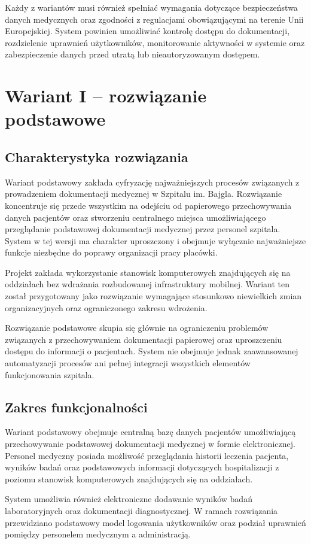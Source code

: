 Każdy z wariantów musi również spełniać wymagania dotyczące bezpieczeństwa danych medycznych oraz zgodności z regulacjami obowiązującymi na terenie Unii Europejskiej. System powinien umożliwiać kontrolę dostępu do dokumentacji, rozdzielenie uprawnień użytkowników, monitorowanie aktywności w systemie oraz zabezpieczenie danych przed utratą lub nieautoryzowanym dostępem.
\section{Wariant I – rozwiązanie podstawowe}

\subsection{Charakterystyka rozwiązania}
Wariant podstawowy zakłada cyfryzację najważniejszych procesów związanych z prowadzeniem dokumentacji medycznej w Szpitalu im. Bajgla. Rozwiązanie koncentruje się przede wszystkim na odejściu od papierowego przechowywania danych pacjentów oraz stworzeniu centralnego miejsca umożliwiającego przeglądanie podstawowej dokumentacji medycznej przez personel szpitala.
System w tej wersji ma charakter uproszczony i obejmuje wyłącznie najważniejsze funkcje niezbędne do poprawy organizacji pracy placówki. 

Projekt zakłada wykorzystanie stanowisk komputerowych znajdujących się na oddziałach bez wdrażania rozbudowanej infrastruktury mobilnej. Wariant ten został przygotowany jako rozwiązanie wymagające stosunkowo niewielkich zmian organizacyjnych oraz ograniczonego zakresu wdrożenia.

Rozwiązanie podstawowe skupia się głównie na ograniczeniu problemów związanych z przechowywaniem dokumentacji papierowej oraz uproszczeniu dostępu do informacji o pacjentach. System nie obejmuje jednak zaawansowanej automatyzacji procesów ani pełnej integracji wszystkich elementów funkcjonowania szpitala.
\subsection{Zakres funkcjonalności}
Wariant podstawowy obejmuje centralną bazę danych pacjentów umożliwiającą przechowywanie podstawowej dokumentacji medycznej w formie elektronicznej. Personel medyczny posiada możliwość przeglądania historii leczenia pacjenta, wyników badań oraz podstawowych informacji dotyczących hospitalizacji z poziomu stanowisk komputerowych znajdujących się na oddziałach.

System umożliwia również elektroniczne dodawanie wyników badań laboratoryjnych oraz dokumentacji diagnostycznej. W ramach rozwiązania przewidziano podstawowy model logowania użytkowników oraz podział uprawnień pomiędzy personelem medycznym a administracją.

